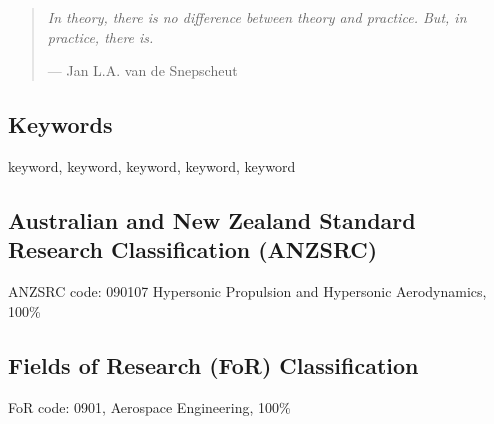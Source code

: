   \begin{quote}
    \emph{In theory, there is no difference between theory and practice. But, in practice, there is.}

    \hfill --- Jan L.A. van de Snepscheut
  \end{quote}

\clearpage
\subsection*{Keywords}
  keyword, keyword, keyword, keyword, keyword

\subsection*{Australian and New Zealand Standard Research Classification (ANZSRC)}

  ANZSRC code: 090107 Hypersonic Propulsion and Hypersonic Aerodynamics, 100\%

\subsection*{Fields of Research (FoR) Classification}

  FoR code: 0901, Aerospace Engineering, 100\%

\tableofcontents

\listoffigures
{}
\listoftables
{}
\printnomenclature